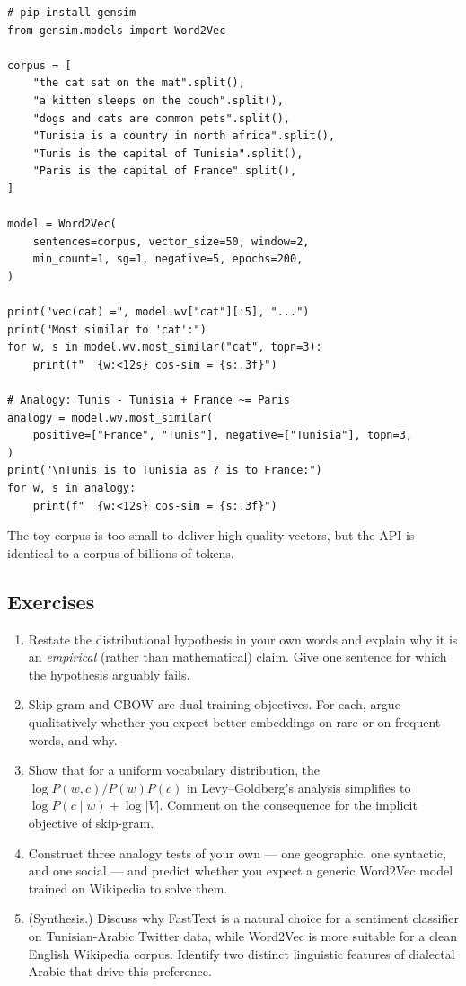 \begin{lstlisting}
# pip install gensim
from gensim.models import Word2Vec

corpus = [
    "the cat sat on the mat".split(),
    "a kitten sleeps on the couch".split(),
    "dogs and cats are common pets".split(),
    "Tunisia is a country in north africa".split(),
    "Tunis is the capital of Tunisia".split(),
    "Paris is the capital of France".split(),
]

model = Word2Vec(
    sentences=corpus, vector_size=50, window=2,
    min_count=1, sg=1, negative=5, epochs=200,
)

print("vec(cat) =", model.wv["cat"][:5], "...")
print("Most similar to 'cat':")
for w, s in model.wv.most_similar("cat", topn=3):
    print(f"  {w:<12s} cos-sim = {s:.3f}")

# Analogy: Tunis - Tunisia + France ~= Paris
analogy = model.wv.most_similar(
    positive=["France", "Tunis"], negative=["Tunisia"], topn=3,
)
print("\nTunis is to Tunisia as ? is to France:")
for w, s in analogy:
    print(f"  {w:<12s} cos-sim = {s:.3f}")
\end{lstlisting}

The toy corpus is too small to deliver high-quality vectors, but the API is identical to a corpus of billions of tokens.

\subsection{Exercises}
\begin{enumerate}
    \item Restate the distributional hypothesis in your own words and explain why it is an \emph{empirical} (rather than mathematical) claim. Give one sentence for which the hypothesis arguably fails.
    \item Skip-gram and CBOW are dual training objectives. For each, argue qualitatively whether you expect better embeddings on rare or on frequent words, and why.
    \item Show that for a uniform vocabulary distribution, the $\log P(w, c)/P(w)P(c)$ in Levy--Goldberg's analysis simplifies to $\log P(c \mid w) + \log |V|$. Comment on the consequence for the implicit objective of skip-gram.
    \item Construct three analogy tests of your own --- one geographic, one syntactic, and one social --- and predict whether you expect a generic Word2Vec model trained on Wikipedia to solve them.
    \item (Synthesis.) Discuss why FastText is a natural choice for a sentiment classifier on Tunisian-Arabic Twitter data, while Word2Vec is more suitable for a clean English Wikipedia corpus. Identify two distinct linguistic features of dialectal Arabic that drive this preference.
\end{enumerate}

